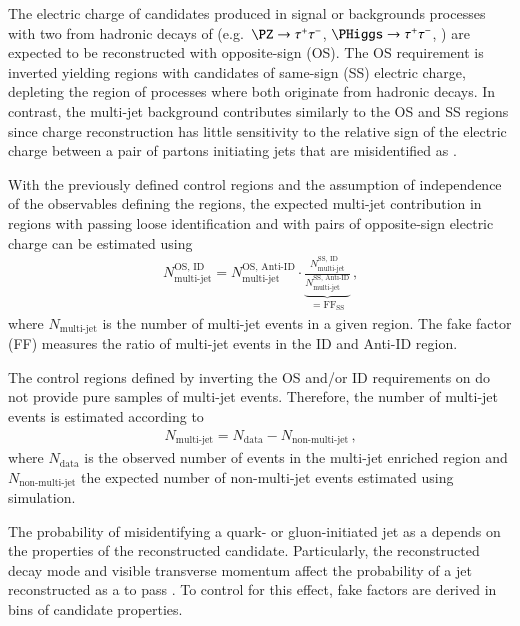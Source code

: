 The electric charge of \tauhadvis candidates produced in signal or
backgrounds processes with two \tauhadvis from hadronic decays of
\tauleptons (e.g.\ $\PZ \to \tautau$, $\PHiggs \to \tautau$, \ttbar)
are expected to be reconstructed with opposite-sign (OS). The OS
requirement is inverted yielding regions with \tauhadvis candidates of
same-sign (SS) electric charge, depleting the region of processes
where both \tauhadvis originate from hadronic \taulepton decays. In
contrast, the multi-jet background contributes similarly to the OS and
SS regions since \tauhadvis charge reconstruction has little
sensitivity to the relative sign of the electric charge between a pair
of partons initiating jets that are misidentified as \tauhadvis.

With the previously defined control regions and the assumption of
independence of the observables defining the regions, the expected
multi-jet contribution in regions with \tauhadvis passing loose
identification and with \tauhadvis pairs of opposite-sign electric
charge can be estimated using
\begin{align*}
  N_\text{multi-jet}^{\text{OS, ID}} =
  N_\text{multi-jet}^{\text{OS, Anti-ID}}
  \cdot
  \underbrace{\frac{N_\text{multi-jet}^{\text{SS, ID}}}
  {N_\text{multi-jet}^{\text{SS, Anti-ID}}}}
  _{= \text{FF}_{\text{SS}}} \,\text{,}
\end{align*}
where $N_\text{multi-jet}$ is the number of multi-jet events in a
given region. The fake factor (FF) measures the ratio of multi-jet
events in the ID and Anti-ID region.%

The control regions defined by inverting the OS and/or ID requirements
on \tauhadvis do not provide pure samples of multi-jet
events. Therefore, the number of multi-jet events is estimated
according to
\begin{align*}
  N_\text{multi-jet} = N_\text{data} - N_\text{non-multi-jet} \,\text{,}
\end{align*}
where $N_\text{data}$ is the observed number of events in the
multi-jet enriched region and $N_\text{non-multi-jet}$ the expected
number of non-multi-jet events estimated using simulation.

The probability of misidentifying a quark- or gluon-initiated jet as a
\tauhadvis depends on the properties of the reconstructed \tauhadvis
candidate. Particularly, the reconstructed decay mode and visible
transverse momentum affect the probability of a jet reconstructed as a
\tauhadvis to pass \tauid. To control for this effect, fake factors
are derived in bins of \tauhadvis candidate properties.

